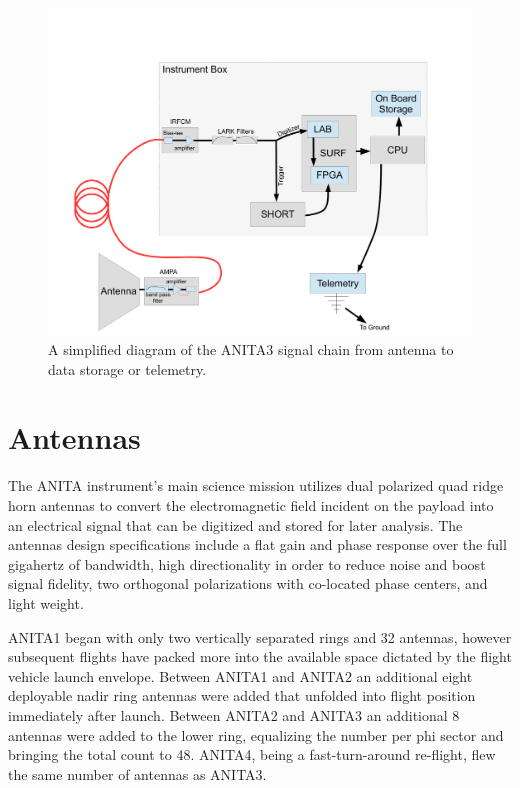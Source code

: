 \begin{figure}
\centering
	\includegraphics[width=\textwidth]{figures/RFChainBlockDiagram}
	\caption{A simplified diagram of the ANITA3 signal chain from antenna to data storage or telemetry.}
	\label{fig:RFChainBlockDiagram}
\end{figure}

	
\section{Antennas}
	The ANITA instrument's main science mission utilizes dual polarized quad ridge horn antennas to convert the electromagnetic field incident on the payload into an electrical signal that can be digitized and stored for later analysis.  The antennas design specifications include a flat gain and phase response over the full gigahertz of bandwidth, high directionality in order to reduce noise and boost signal fidelity, two orthogonal polarizations with co-located phase centers, and light weight.
	
	ANITA1 began with only two vertically separated rings and 32 antennas, however subsequent flights have packed more into the available space dictated by the flight vehicle launch envelope.  Between ANITA1 and ANITA2 an additional eight deployable nadir ring antennas were added that unfolded into flight position immediately after launch.  Between ANITA2 and ANITA3 an additional 8 antennas were added to the lower ring, equalizing the number per phi sector and bringing the total count to 48.  ANITA4, being a fast-turn-around re-flight, flew the same number of antennas as ANITA3.
	
